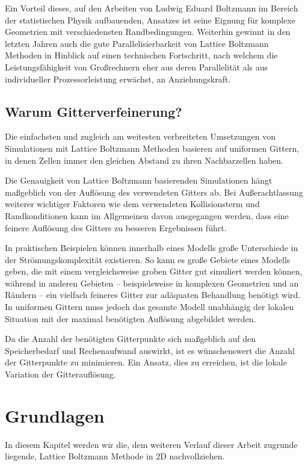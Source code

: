 \bigskip
Ein Vorteil dieses, auf den Arbeiten von Ludwig Eduard Boltzmann im Bereich der statistischen Physik aufbauenden, Ansatzes ist seine Eignung für komplexe Geometrien mit verschiedensten Randbedingungen. Weiterhin gewinnt in den letzten Jahren auch die gute Parallelisierbarkeit von Lattice Boltzmann Methoden in Hinblick auf einen technischen Fortschritt, nach welchem die Leistungsfähigkeit von Großrechnern eher aus deren Parallelität als aus individueller Prozessorleistung erwächst, an Anziehungskraft.

\subsection{Warum Gitterverfeinerung?}

Die einfachsten und zugleich am weitesten verbreiteten Umsetzungen von Simulationen mit Lattice Boltzmann Methoden basieren auf uniformen Gittern, in denen Zellen immer den gleichen Abstand zu ihren Nachbarzellen haben.

Die Genauigkeit von Lattice Boltzmann basierenden Simulationen hängt maßgeblich von der Auflösung des verwendeten Gitters ab. Bei Außerachtlassung weiterer wichtiger Faktoren wie dem verwendeten Kollisionsterm und Randkonditionen kann im Allgemeinen davon ausgegangen werden, dass eine feinere Auflösung des Gitters zu besseren Ergebnissen führt.

In praktischen Beispielen können innerhalb eines Modells große Unterschiede in der Strömungskomplexität existieren. So kann es große Gebiete eines Modells geben, die mit einem vergleichsweise groben Gitter gut simuliert werden können, während in anderen Gebieten -- beispielsweise in komplexen Geometrien und an Rändern -- ein vielfach feineres Gitter zur adäquaten Behandlung benötigt wird. In uniformen Gittern muss jedoch das gesamte Modell unabhängig der lokalen Situation mit der maximal benötigten Auflösung abgebildet werden.

Da die Anzahl der benötigten Gitterpunkte sich maßgeblich auf den Speicherbedarf und Rechenaufwand auswirkt, ist es wünschenswert die Anzahl der Gitterpunkte zu minimieren. Ein Ansatz, dies zu erreichen, ist die lokale Variation der Gitterauflösung.

\newpage
\section{Grundlagen}

In diesem Kapitel werden wir die, dem weiteren Verlauf dieser Arbeit zugrunde liegende, Lattice Boltzmann Methode in 2D nachvollziehen.

